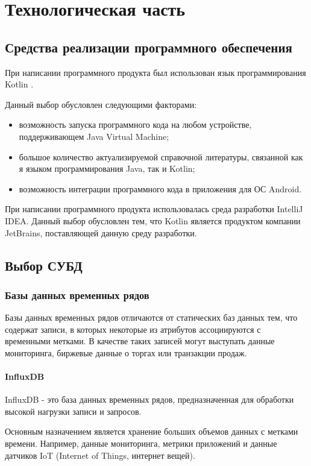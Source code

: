 \section{Технологическая часть}
\subsection{Средства реализации программного обеспечения}
При написании программного продукта был использован язык программирования Kotlin \cite{Kotlin}.

Данный выбор обусловлен следующими факторами:
\begin{itemize}[leftmargin=1.6\parindent]
\item возможность запуска программного кода на любом устройстве, поддерживающем Java Virtual Machine;
\item большое количество актуализируемой справочной литературы, связанной как я языком программирования Java, так и Kotlin;
\item возможность интеграции программного кода в приложения для ОС Android.
\end{itemize}

При написании программного продукта использовалась среда разработки IntelliJ IDEA. Данный выбор обусловлен тем, что Kotlin является продуктом компании JetBrains, поставляющей данную среду разработки.

\subsection{Выбор СУБД}

\subsubsection{Базы данных временных рядов}
Базы данных временных рядов отличаются от статических баз данных тем, что содержат записи, в которых некоторые из атрибутов ассоциируются с временными метками. В качестве таких записей могут выступать данные мониторинга, биржевые данные о торгах или транзакции продаж. \cite{bdvrAnomalies}

\paragraph{InfluxDB}
InfluxDB - это база данных временных рядов, предназначенная для обработки высокой нагрузки записи и запросов.

Основным назначением является хранение больших объемов данных с метками времени. Например, данные мониторинга, метрики приложений и данные датчиков IoT (Internet of Things, интернет вещей).

